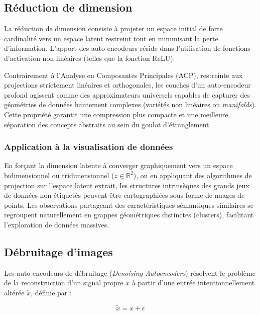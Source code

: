 \documentclass[11pt,a4paper]{report}
\begin{document}
\subsection{Réduction de dimension}
\label{subsec:reduction_dimension}

La réduction de dimension consiste à projeter un espace initial de forte cardinalité vers un espace latent restreint tout en minimisant la perte d'information. L'apport des auto-encodeurs réside dans l'utilisation de fonctions d'activation non linéaires (telles que la fonction ReLU).

Contrairement à l'Analyse en Composantes Principales (ACP), restreinte aux projections strictement linéaires et orthogonales, les couches d'un auto-encodeur profond agissent comme des approximateurs universels capables de capturer des géométries de données hautement complexes (variétés non linéaires ou \textit{manifolds}). Cette propriété garantit une compression plus compacte et une meilleure séparation des concepts abstraits au sein du goulot d'étranglement.

\subsubsection*{Application à la visualisation de données}

En forçant la dimension latente à converger graphiquement vers un espace bidimensionnel ou tridimensionnel ($z \in \mathbb{R}^2$), ou en appliquant des algorithmes de projection sur l'espace latent extrait, les structures intrinsèques des grands jeux de données non étiquetés peuvent être cartographiées sous forme de nuages de points. Les observations partageant des caractéristiques sémantiques similaires se regroupent naturellement en grappes géométriques distinctes (clusters), facilitant l'exploration de données massives.

\subsection{Débruitage d'images}
\label{subsec:debruitage_images}

Les auto-encodeurs de débruitage (\textit{Denoising Autoencoders}) résolvent le problème de la reconstruction d'un signal propre $x$ à partir d'une entrée intentionnellement altérée $\tilde{x}$, définie par :

\begin{equation}
    \tilde{x} = x + \epsilon
\end{equation}
\end{document}
